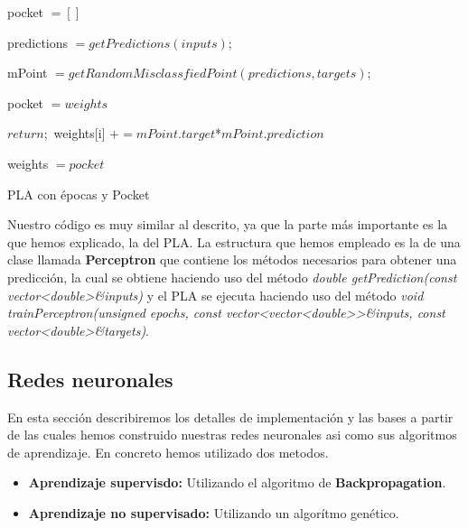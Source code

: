 \newpage
\begin{algorithm}[H]
    pocket $= []$
    
    {
        predictions $= getPredictions(inputs);$
        
        mPoint $= getRandomMisclassfiedPoint(predictions, targets);$
        
        {
            pocket $= weights$
        }
        
        {
    		$return;$
    	}
    	{
            {
                weights[i] $+= mPoint.target$*$mPoint.prediction$
            }
    	}
	}
	
	{
	    weights $= pocket$
	}
	\caption{PLA con épocas y Pocket}
	\label{alg:plawithepochsandpocket}
\end{algorithm}
\vspace{2mm}

Nuestro código es muy similar al descrito, ya que la parte más importante es la que hemos explicado, la del PLA. La estructura que hemos empleado es la de una clase llamada \textbf{Perceptron} que contiene los métodos necesarios para obtener una predicción, la cual se obtiene haciendo uso del método \textit{double getPrediction(const vector\textless double\textgreater \&inputs)} y el PLA se ejecuta haciendo uso del método \textit{void trainPerceptron(unsigned epochs, const vector\textless vector\textless double\textgreater \textgreater \&inputs, const vector\textless double\textgreater \&targets)}.

\newpage
\subsection{Redes neuronales}
\label{subsec:nn}

En esta sección describiremos los detalles de implementación y las bases a partir de las cuales hemos construido nuestras redes neuronales asi como sus algoritmos de aprendizaje. En concreto hemos utilizado dos metodos.

\begin{itemize}
    \item \textbf{Aprendizaje supervisdo:} Utilizando el algoritmo de \textbf{Backpropagation}.
    \item \textbf{Aprendizaje no supervisado:} Utilizando un algorítmo genético.
\end{itemize}

